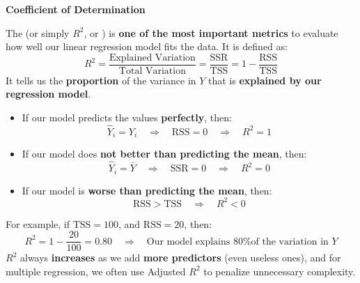 \newpage

\begin{flushleft}
    \textcolor{Green3}{ \textbf{Coefficient of Determination}}
\end{flushleft}
The  (or simply $R^2$, or ) is \textbf{one of the most important metrics} to evaluate how well our linear regression model fits the data. It is defined as:
\begin{equation}\label{eq: coefficient of determination}
    R^{2} = \dfrac{
        \text{Explained Variation}
    }{
        \text{Total Variation}
    } =
    \dfrac{\text{SSR}}{\text{TSS}} =
    1 - \dfrac{\text{RSS}}{\text{TSS}}
\end{equation}
It tells us the \textbf{proportion} of the variance in $Y$ that is \textbf{explained by our regression model}.
\begin{itemize}
    \item[\textcolor{Green3}{\faIcon{check-circle}}] If our model predicts the values \textbf{perfectly}, then:
    \begin{equation*}
        \hat{Y}_i = Y_i \quad \Rightarrow \quad \text{RSS} = 0 \quad \Rightarrow \quad R^{2} = 1
    \end{equation*}

    \item[\textcolor{Orange3}{\faIcon{balance-scale}}] If our model does \textbf{not better than predicting the mean}, then:
    \begin{equation*}
        \hat{Y}_i = \bar{Y} \quad \Rightarrow \quad \text{SSR} = 0 \quad \Rightarrow \quad R^{2} = 0
    \end{equation*}

    \item[\textcolor{Red2}{\faIcon{times-circle}}] If our model is \textbf{worse than predicting the mean}, then:
    \begin{equation*}
        \text{RSS} > \text{TSS} \quad \Rightarrow \quad R^{2} < 0
    \end{equation*}
\end{itemize}
For example, if $\text{TSS} = 100$, and $\text{RSS} = 20$, then:
\begin{equation*}
    R^{2} = 1 - \dfrac{20}{100} = 0.80 \quad \Rightarrow \quad \text{Our model explains 80\% of the variation in } Y
\end{equation*}
$R^{2}$ always \textbf{increases} as we add \textbf{more predictors} (even useless ones), and for multiple regression, we often use Adjusted $R^{2}$ to penalize unnecessary complexity.

